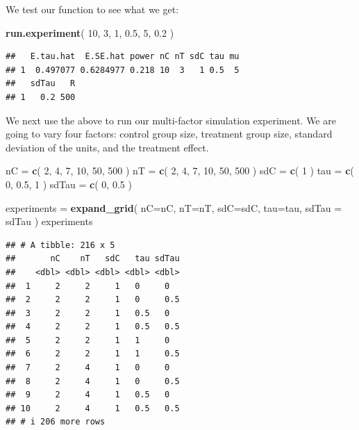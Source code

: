 \documentclass[
]{book}
\newenvironment{Shaded}{\begin{snugshade}}{\end{snugshade}}
\newcommand{\AttributeTok}[1]{\textcolor[rgb]{0.13,0.29,0.53}{#1}}
\newcommand{\DecValTok}[1]{\textcolor[rgb]{0.00,0.00,0.81}{#1}}
\newcommand{\FloatTok}[1]{\textcolor[rgb]{0.00,0.00,0.81}{#1}}
\newcommand{\FunctionTok}[1]{\textcolor[rgb]{0.13,0.29,0.53}{\textbf{#1}}}
\newcommand{\NormalTok}[1]{#1}
\newcommand{\OtherTok}[1]{\textcolor[rgb]{0.56,0.35,0.01}{#1}}
\begin{document}
We test our function to see what we get:

\begin{Shaded}
\begin{Highlighting}[]
\FunctionTok{run.experiment}\NormalTok{( }\DecValTok{10}\NormalTok{, }\DecValTok{3}\NormalTok{, }\DecValTok{1}\NormalTok{, }\FloatTok{0.5}\NormalTok{, }\DecValTok{5}\NormalTok{, }\FloatTok{0.2}\NormalTok{ )}
\end{Highlighting}
\end{Shaded}

\begin{verbatim}
##   E.tau.hat  E.SE.hat power nC nT sdC tau mu
## 1  0.497077 0.6284977 0.218 10  3   1 0.5  5
##   sdTau   R
## 1   0.2 500
\end{verbatim}

We next use the above to run our multi-factor simulation experiment.
We are going to vary four factors: control group size, treatment group size,
standard deviation of the units, and the treatment effect.

\begin{Shaded}
\begin{Highlighting}[]
\NormalTok{nC }\OtherTok{=} \FunctionTok{c}\NormalTok{( }\DecValTok{2}\NormalTok{, }\DecValTok{4}\NormalTok{, }\DecValTok{7}\NormalTok{, }\DecValTok{10}\NormalTok{, }\DecValTok{50}\NormalTok{, }\DecValTok{500}\NormalTok{ )}
\NormalTok{nT }\OtherTok{=} \FunctionTok{c}\NormalTok{( }\DecValTok{2}\NormalTok{, }\DecValTok{4}\NormalTok{, }\DecValTok{7}\NormalTok{, }\DecValTok{10}\NormalTok{, }\DecValTok{50}\NormalTok{, }\DecValTok{500}\NormalTok{ )}
\NormalTok{sdC }\OtherTok{=} \FunctionTok{c}\NormalTok{( }\DecValTok{1}\NormalTok{ )}
\NormalTok{tau }\OtherTok{=} \FunctionTok{c}\NormalTok{( }\DecValTok{0}\NormalTok{, }\FloatTok{0.5}\NormalTok{, }\DecValTok{1}\NormalTok{ )}
\NormalTok{sdTau }\OtherTok{=} \FunctionTok{c}\NormalTok{( }\DecValTok{0}\NormalTok{, }\FloatTok{0.5}\NormalTok{ )}

\NormalTok{experiments }\OtherTok{=} \FunctionTok{expand\_grid}\NormalTok{( }\AttributeTok{nC=}\NormalTok{nC, }\AttributeTok{nT=}\NormalTok{nT, }\AttributeTok{sdC=}\NormalTok{sdC, }\AttributeTok{tau=}\NormalTok{tau, }\AttributeTok{sdTau =}\NormalTok{ sdTau )}
\NormalTok{experiments}
\end{Highlighting}
\end{Shaded}

\begin{verbatim}
## # A tibble: 216 x 5
##       nC    nT   sdC   tau sdTau
##    <dbl> <dbl> <dbl> <dbl> <dbl>
##  1     2     2     1   0     0  
##  2     2     2     1   0     0.5
##  3     2     2     1   0.5   0  
##  4     2     2     1   0.5   0.5
##  5     2     2     1   1     0  
##  6     2     2     1   1     0.5
##  7     2     4     1   0     0  
##  8     2     4     1   0     0.5
##  9     2     4     1   0.5   0  
## 10     2     4     1   0.5   0.5
## # i 206 more rows
\end{verbatim}
\end{document}
